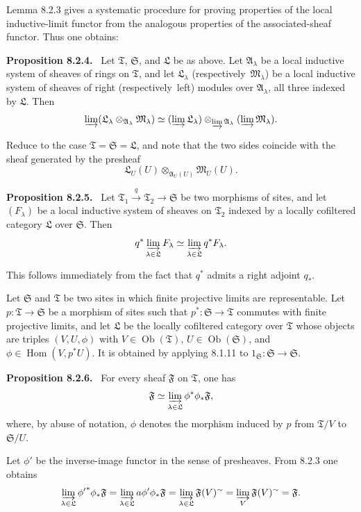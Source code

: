 \documentclass[11pt]{article}
\newcommand{\Hom}{\operatorname{Hom}}
\newcommand{\ob}{\operatorname{Ob}}
\newcommand{\resp}{respectively}
\newcommand{\Aa}{\mathfrak{A}}
\newcommand{\Ss}{\mathfrak{S}}
\newcommand{\Tt}{\mathfrak{T}}
\newcommand{\Ll}{\mathfrak{L}}
\newcommand{\Mm}{\mathfrak{M}}
\newcommand{\Ff}{\mathfrak{F}}
\newenvironment{statement}[1]{\par\medskip\noindent\textbf{#1.}\ }{\par\medskip}
\begin{document}
Lemma 8.2.3 gives a systematic procedure for proving properties of the local inductive-limit functor from the analogous properties of the associated-sheaf functor. Thus one obtains:

\begin{statement}{Proposition 8.2.4}
Let $\Tt$, $\Ss$, and $\Ll$ be as above. Let $\Aa_\lambda$ be a local inductive system of sheaves of rings on $\Tt$, and let $\Ll_\lambda$ (\resp\ $\Mm_\lambda$) be a local inductive system of sheaves of right (\resp\ left) modules over $\Aa_\lambda$, all three indexed by $\Ll$. Then
\[
\varinjlim(\Ll_\lambda\otimes_{\Aa_\lambda}\Mm_\lambda)
\simeq
(\varinjlim\Ll_\lambda)\otimes_{\varinjlim\Aa_\lambda}(\varinjlim\Mm_\lambda).
\]
\end{statement}

Reduce to the case $\Tt=\Ss=\Ll$, and note that the two sides coincide with the sheaf generated by the presheaf
\[
        \Ll_U(U)\otimes_{\Aa_U(U)}\Mm_U(U).
\]

\begin{statement}{Proposition 8.2.5}
Let $\Tt_1\xrightarrow q\Tt_2\to\Ss$ be two morphisms of sites, and let $(F_\lambda)$ be a local inductive system of sheaves on $\Tt_2$ indexed by a locally cofiltered category $\Ll$ over $\Ss$. Then
\[
        q^*\varinjlim_{\lambda\in\Ll}F_\lambda
        \simeq
        \varinjlim_{\lambda\in\Ll}q^*F_\lambda.
\]
\end{statement}

This follows immediately from the fact that $q^*$ admits a right adjoint $q_*$.

Let $\Ss$ and $\Tt$ be two sites in which finite projective limits are representable. Let $p:\Tt\to\Ss$ be a morphism of sites such that $p^*:\Ss\to\Tt$ commutes with finite projective limits, and let $\Ll$ be the locally cofiltered category over $\Tt$ whose objects are triples $(V,U,\phi)$ with $V\in\ob(\Tt)$, $U\in\ob(\Ss)$, and $\phi\in\Hom(V,p^*U)$. It is obtained by applying 8.1.11 to $1_\Ss:\Ss\to\Ss$.

\begin{statement}{Proposition 8.2.6}
For every sheaf $\Ff$ on $\Tt$, one has
\[
        \Ff\simeq \varinjlim_{\lambda\in\Ll}\phi^*\phi_*\Ff,
\]
where, by abuse of notation, $\phi$ denotes the morphism induced by $p$ from $\Tt/V$ to $\Ss/U$.
\end{statement}

Let $\phi'$ be the inverse-image functor in the sense of presheaves. From 8.2.3 one obtains
\[
\varinjlim_{\lambda\in\Ll}{\phi'}^*\phi_*\Ff
 =\varinjlim_{\lambda\in\Ll}a\phi'\phi_*\Ff
 =\varinjlim_{\lambda\in\Ll}\Ff(V)^{\sim}
 =\varinjlim_V\Ff(V)^{\sim}
 =\Ff.
\]
\end{document}
